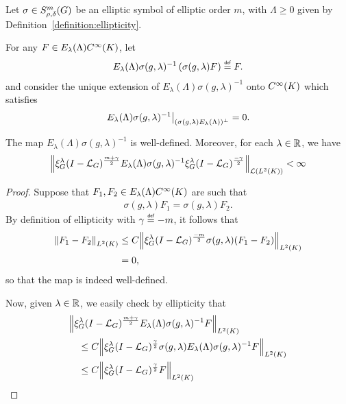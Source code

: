 \begin{lemma}
\label{lemma:inverse_of_elliptic_symbol}
    Let $\sigma \in \SymbolClass m {\rho, \delta}$ be an elliptic symbol of elliptic order $m$,
    with $\Lambda \geq 0$ given by Definition~\ref{definition:ellipticity}.

    For any $F \in E_\lambda(\Lambda) \SmoothFunctions \CompactGroup$,
    let
    \begin{align*}
        E_\lambda(\Lambda) \sigma(g, \lambda)^{-1} \left(\sigma(g, \lambda) F\right) \defeq F.
    \end{align*}
    and consider the unique extension of $E_\lambda(\Lambda) \sigma(g, \lambda)^{-1}$ onto $\SmoothFunctions \CompactGroup$ which satisfies
    \begin{align*}
        \eval {%
            E_\lambda(\Lambda) \sigma(g, \lambda)^{-1}
            } {(\sigma(g, \lambda) E_\lambda(\Lambda))^\perp} = 0.
    \end{align*}

    The map $E_\lambda(\Lambda) \sigma(g, \lambda)^{-1}$ is well-defined.
    Moreover,
    for each $\lambda \in \R$,
    we have
    \begin{align*}
        \norm [\Lin {\Lebesgue 2 \CompactGroup}] {%
            \Rep \lambda \BesselPotential {m + \gamma}
            E_\lambda(\Lambda) \sigma(g, \lambda)^{-1}
            \Rep \lambda \BesselPotential {-\gamma}
        }
        < \infty
    \end{align*}
\end{lemma}
\begin{proof}
    Suppose that $F_1, F_2 \in E_\lambda(\Lambda) \SmoothFunctions \CompactGroup$ are such that
    \begin{align*}
        \sigma(g, \lambda) F_1
        = \sigma(g, \lambda) F_2.
    \end{align*}
    By definition of ellipticity with $\gamma \defeq - m$,
    it follows that
    \begin{align*}
        \norm [\Lebesgue 2 \CompactGroup] {F_1 - F_2}
        &\leq C
        \norm [\Lebesgue 2 \CompactGroup] {\Rep \lambda \BesselPotential {-m} \sigma(g, \lambda) (F_1 - F_2)}\\
        &= 0,
    \end{align*}
    so that the map is indeed well-defined.

    Now, given $\lambda \in \R$,
    we easily check by ellipticity that
    \begin{align*}
        &\norm [\Lebesgue 2 \CompactGroup] {\Rep \lambda \BesselPotential {m + \gamma} E_\lambda(\Lambda) \sigma(g, \lambda)^{-1} F}\\
        &\quad \leq C
        \norm [\Lebesgue 2 \CompactGroup] {\Rep \lambda \BesselPotential {\gamma} \sigma(g, \lambda) E_\lambda(\Lambda) \sigma(g, \lambda)^{-1} F}\\
        &\quad \leq C
        \norm [\Lebesgue 2 \CompactGroup] {\Rep \lambda \BesselPotential {\gamma} F}
    \end{align*}
\end{proof}

